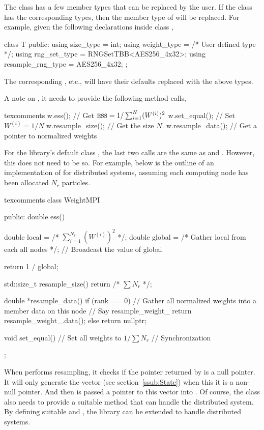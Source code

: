 \documentclass[11pt,bib,mint,hyper,altcolor]{marticle}
\begin{document}
The  class has a few member types that can be replaced
by the user. If the class  has the corresponding types, then the
member type of  will be replaced. For example, given the
following declarations inside class ,
\begin{cppcode}
  class T
  {
      public:
      using size_type = int;
      using weight_type = /* User defined type */;
      using rng_set_type = RNGSetTBB<AES256_4x32>;
      using resample_rng_type = AES256_4x32;
  };
\end{cppcode}
The corresponding , etc., will have their
defaults replaced with the above types.

A note on , it needs to provide the following method
calls,
\begin{cppcode*}{texcomments}
  w.ess();       // Get $\text{\normalfont\textsc{ess}} = 1/\sum_{i=1}^N(W^{(i)})^2$
  w.set_equal(); // Set $W^{(i)} = 1/N$
  w.resample_size(); // Get the size $N$.
  w.resample_data(); // Get a pointer to normalized weights
\end{cppcode*}
For the library's default class , the last two calls are the
same as  and . However, this does not
need to be so. For example, below is the outline of an implementation of
 for distributed systems, assuming each computing node
has been allocated $N_r$ particles.
\begin{cppcode*}{texcomments}
  class WeightMPI
  {
      public:
      double ess()
      {
          double local = /* $\sum_{i=1}^{N_r}(W^{(i)})^2$ */;
          double global = /* Gather local from each all nodes */;
          // Broadcast the value of global

          return 1 / global;
      }

      std::size_t resample_size() { return /* $\sum N_r$ */; }

      double *resample_data()
      {
          if (rank == 0) {
              // Gather all normalized weights into a member data on this node
              // Say resample\_weight\_
              return resample_weight_.data();
          } else {
              return nullptr;
          }
      }

      void set_equal()
      {
          // Set all weights to $1 / \sum N_r$
          // Synchronization
      }
  };
\end{cppcode*}
When  performs resampling, it checks if the pointer
returned by  is a null pointer. It will only
generate the vector  (see section~\ref{ssub:State}) when
this it is a non-null pointer. And then  is passed a pointer
to this vector into . Of course, the class 
also needs to provide a suitable method  that can handle the
distributed system. By defining suitable  and
, the library can be extended to handle distributed systems.
\end{document}
